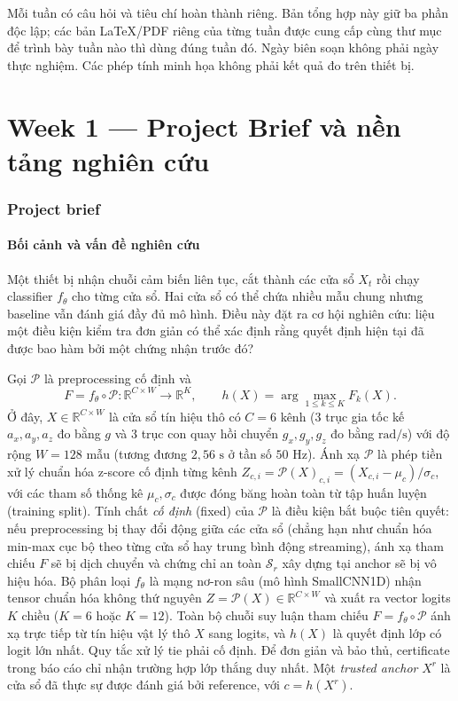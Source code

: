 \documentclass[11pt,a4paper]{article}
\newcommand{\R}{\mathbb R}
\newcommand{\Sset}{\mathcal S}
\theoremstyle{remark}
\begin{document}
Mỗi tuần có câu hỏi và tiêu chí hoàn thành riêng. Bản tổng hợp này giữ ba
phần độc lập; các bản LaTeX/PDF riêng của từng tuần được cung cấp cùng thư
mục để trình bày tuần nào thì dùng đúng tuần đó. Ngày biên soạn không phải
ngày thực nghiệm. Các phép tính minh họa không phải kết quả đo trên thiết bị.

\part{Week 1 --- Project Brief và nền tảng nghiên cứu}
\section{Project brief}
\subsection{Bối cảnh và vấn đề nghiên cứu}
Một thiết bị nhận chuỗi cảm biến liên tục, cắt thành các cửa sổ $X_t$ rồi
chạy classifier $f_\theta$ cho từng cửa sổ. Hai cửa sổ có thể chứa nhiều mẫu
chung nhưng baseline vẫn đánh giá đầy đủ mô hình. Điều này đặt ra cơ hội
nghiên cứu: liệu một điều kiện kiểm tra đơn giản có thể xác định rằng quyết
định hiện tại đã được bao hàm bởi một chứng nhận trước đó?

Gọi $\mathcal P$ là preprocessing cố định và
\begin{equation}
 F=f_\theta\circ\mathcal P:\R^{C\times W}\longrightarrow\R^K,
 \qquad h(X)=\arg\max_{1\le k\le K}F_k(X).
 \label{eq:reference}
\end{equation}
Ở đây, $X\in\R^{C\times W}$ là cửa sổ tín hiệu thô có $C=6$ kênh (3 trục gia tốc kế $a_x,a_y,a_z$ đo bằng $g$ và 3 trục con quay hồi chuyển $g_x,g_y,g_z$ đo bằng $\text{rad/s}$) với độ rộng $W=128$ mẫu (tương đương $2{,}56\text{ s}$ ở tần số $50\text{ Hz}$). Ánh xạ $\mathcal P$ là phép tiền xử lý chuẩn hóa z-score cố định từng kênh $Z_{c,i}=\mathcal P(X)_{c,i}=(X_{c,i}-\mu_c)/\sigma_c$, với các tham số thống kê $\mu_c,\sigma_c$ được đóng băng hoàn toàn từ tập huấn luyện (training split). Tính chất \emph{cố định} (fixed) của $\mathcal P$ là điều kiện bắt buộc tiên quyết: nếu preprocessing bị thay đổi động giữa các cửa sổ (chẳng hạn như chuẩn hóa min-max cục bộ theo từng cửa sổ hay trung bình động streaming), ánh xạ tham chiếu $F$ sẽ bị dịch chuyển và chứng chỉ an toàn $\Sset_r$ xây dựng tại anchor sẽ bị vô hiệu hóa. Bộ phân loại $f_\theta$ là mạng nơ-ron sâu (mô hình SmallCNN1D) nhận tensor chuẩn hóa không thứ nguyên $Z=\mathcal P(X)\in\R^{C\times W}$ và xuất ra vector logits $K$ chiều ($K=6$ hoặc $K=12$). Toàn bộ chuỗi suy luận tham chiếu $F=f_\theta\circ\mathcal P$ ánh xạ trực tiếp từ tín hiệu vật lý thô $X$ sang logits, và $h(X)$ là quyết định lớp có logit lớn nhất. Quy tắc xử lý tie
phải cố định. Để đơn giản và bảo thủ, certificate trong báo cáo chỉ nhận
trường hợp lớp thắng duy nhất. Một \emph{trusted anchor} $X^r$ là cửa sổ đã
thực sự được đánh giá bởi reference, với $c=h(X^r)$.
\end{document}
